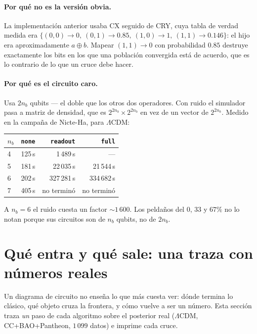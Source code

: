\documentclass[11pt,a4paper]{article}
\begin{document}
\paragraph{Por qué no es la versión obvia.} La implementación anterior usaba
CX seguido de CRY, cuya tabla de verdad medida era
$\{(0,0)\to0,\ (0,1)\to0.85,\ (1,0)\to1,\ (1,1)\to0.146\}$: el hijo era
aproximadamente $a \oplus b$. Mapear $(1,1)\to0$ con probabilidad $0.85$
destruye exactamente los bits en los que una población convergida está de
acuerdo, que es lo contrario de lo que un cruce debe hacer.

\paragraph{Por qué es el circuito caro.} Usa $2n_b$ qubits --- el doble que
los otros dos operadores. Con ruido el simulador pasa a matriz de densidad,
que es $2^{2n_b}\times 2^{2n_b}$ en vez de un vector de $2^{2n_b}$. Medido en
la campaña de Nicte-Ha, para $\Lambda$CDM:

\begin{center}
\small
\begin{tabular}{lrrr}
\toprule
$n_b$ & \texttt{none} & \texttt{readout} & \texttt{full} \\
\midrule
4 & 125\,s   & 1\,489\,s   & --- \\
5 & 181\,s   & 22\,035\,s  & 21\,544\,s \\
6 & 202\,s   & 327\,281\,s & 334\,682\,s \\
7 & 405\,s   & no terminó  & no terminó \\
\bottomrule
\end{tabular}
\end{center}

\noindent
A $n_b=6$ el ruido cuesta un factor $\sim 1\,600$. Los peldaños del $0$,
$33$ y $67\%$ no lo notan porque sus circuitos son de $n_b$ qubits, no de
$2n_b$.

\clearpage
\section{Qué entra y qué sale: una traza con números reales}

Un diagrama de circuito no enseña lo que más cuesta ver: dónde termina lo
clásico, qué objeto cruza la frontera, y cómo vuelve a ser un número. Esta
sección traza \emph{un} paso de cada algoritmo sobre el posterior real
($\Lambda$CDM, CC+BAO+Pantheon, $1\,099$ datos) e imprime cada cruce.
\end{document}
